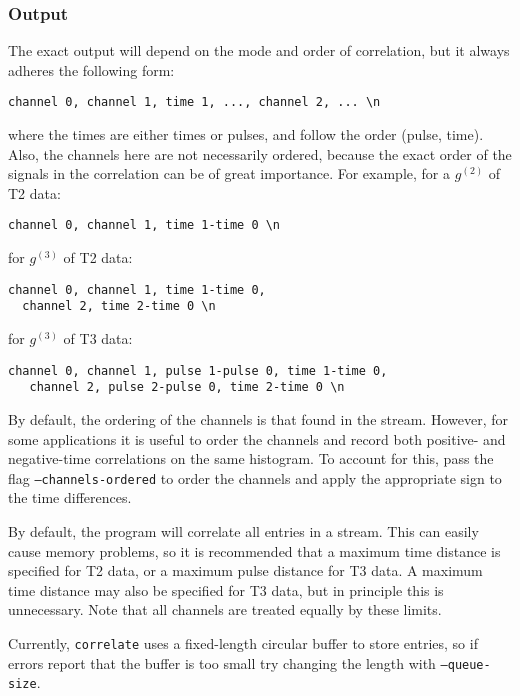 \documentclass{article}
\newcommand{\correlate}{\texttt{correlate}}
\newcommand{\gn}[1]{\ensuremath{g^{(#1)}}}
\begin{document}
\subsubsection{Output}
The exact output will depend on the mode and order of correlation, but it always adheres the following form:
\begin{verbatim}
channel 0, channel 1, time 1, ..., channel 2, ... \n
\end{verbatim}
where the times are either times or pulses, and follow the order (pulse, time). Also, the channels here are not necessarily ordered, because the exact order of the signals in the correlation can be of great importance. For example, for a \gn{2} of T2 data:
\begin{verbatim}
channel 0, channel 1, time 1-time 0 \n
\end{verbatim}
for \gn{3} of T2 data:
\begin{verbatim}
channel 0, channel 1, time 1-time 0, 
  channel 2, time 2-time 0 \n
\end{verbatim}
for \gn{3} of T3 data:
\begin{verbatim}
channel 0, channel 1, pulse 1-pulse 0, time 1-time 0,
   channel 2, pulse 2-pulse 0, time 2-time 0 \n
\end{verbatim}

By default, the ordering of the channels is that found in the stream. However, for some applications it is useful to order the channels and record both positive- and negative-time correlations on the same histogram. To account for this, pass the flag \texttt{--channels-ordered} to order the channels and apply the appropriate sign to the time differences.

By default, the program will correlate all entries in a stream. This can easily cause memory problems, so it is recommended that a maximum time distance is specified for T2 data, or a maximum pulse distance for T3 data. A maximum time distance may also be specified for T3 data, but in principle this is unnecessary. Note that all channels are treated equally by these limits. 

Currently, \correlate{} uses a fixed-length circular buffer to store entries, so if errors report that the buffer is too small try changing the length with \texttt{--queue-size}.
\end{document}
